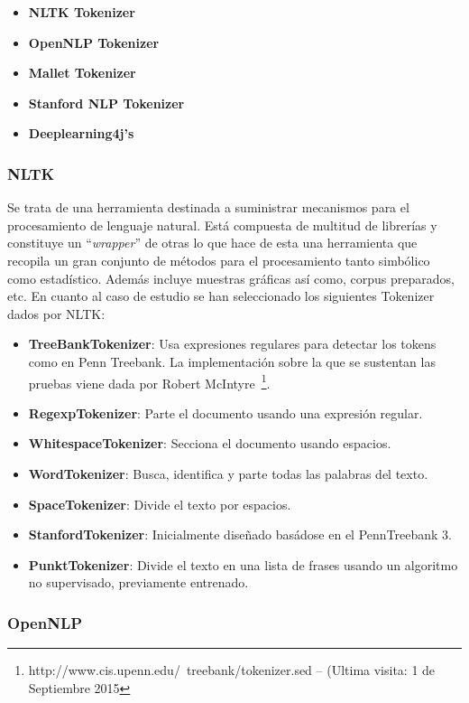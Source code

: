 \documentclass[runningheads,a4paper]{llncs}
\theoremstyle{break}
\begin{document}
\begin{itemize}
    \item \textbf{NLTK Tokenizer}
    \item \textbf{OpenNLP Tokenizer}
    \item \textbf{Mallet Tokenizer}
       \item \textbf{Stanford NLP Tokenizer}
    \item \textbf{Deeplearning4j’s}
\end{itemize}


\subsubsection{NLTK}
\textbf{}

Se trata de una herramienta destinada a suministrar mecanismos para el procesamiento de lenguaje natural. Está compuesta de multitud de librerías y constituye un ``\textit{wrapper}'' de otras lo que hace de esta una herramienta que recopila un gran conjunto de métodos para el procesamiento tanto simbólico como estadístico. Además incluye muestras gráficas así como, corpus preparados, etc. En cuanto al caso de estudio se han seleccionado los siguientes Tokenizer dados por NLTK:

\begin{itemize}
\item \textbf{TreeBankTokenizer}: Usa expresiones regulares para detectar los tokens como en Penn Treebank. La implementación sobre la que se sustentan las pruebas viene dada por Robert McIntyre~\footnote{http://www.cis.upenn.edu/~treebank/tokenizer.sed -- (Ultima visita: 1 de Septiembre 2015}.
\item \textbf{RegexpTokenizer}: Parte el documento usando una expresión regular.
\item \textbf{WhitespaceTokenizer}: Secciona el documento usando espacios.
\item \textbf{WordTokenizer}: Busca, identifica y parte todas las palabras del texto.
\item \textbf{SpaceTokenizer}: Divide el texto por espacios.
\item \textbf{StanfordTokenizer}: Inicialmente diseñado basádose en el PennTreebank 3.
\item \textbf{PunktTokenizer}: Divide el texto en una lista de frases usando un algoritmo no supervisado, previamente entrenado.
\end{itemize}

\subsubsection{OpenNLP}
\textbf{}
\end{document}
